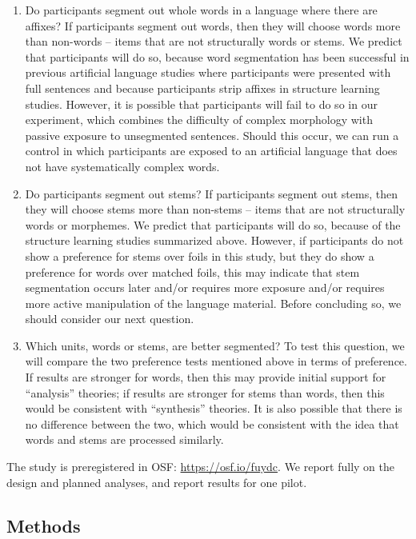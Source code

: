 \documentclass[
  american,
  ,man,floatsintext]{apa6}
\providecommand{\tightlist}{%
  \setlength{\itemsep}{0pt}\setlength{\parskip}{0pt}}
\begin{document}
\begin{enumerate}
\def\labelenumi{\arabic{enumi}.}
\tightlist
\item
  Do participants segment out whole words in a language where there are affixes? If participants segment out words, then they will choose words more than non-words -- items that are not structurally words or stems. We predict that participants will do so, because word segmentation has been successful in previous artificial language studies where participants were presented with full sentences and because participants strip affixes in structure learning studies. However, it is possible that participants will fail to do so in our experiment, which combines the difficulty of complex morphology with passive exposure to unsegmented sentences. Should this occur, we can run a control in which participants are exposed to an artificial language that does not have systematically complex words.
\item
  Do participants segment out stems? If participants segment out stems, then they will choose stems more than non-stems -- items that are not structurally words or morphemes. We predict that participants will do so, because of the structure learning studies summarized above. However, if participants do not show a preference for stems over foils in this study, but they do show a preference for words over matched foils, this may indicate that stem segmentation occurs later and/or requires more exposure and/or requires more active manipulation of the language material. Before concluding so, we should consider our next question.
\item
  Which units, words or stems, are better segmented? To test this question, we will compare the two preference tests mentioned above in terms of preference. If results are stronger for words, then this may provide initial support for ``analysis'' theories; if results are stronger for stems than words, then this would be consistent with ``synthesis'' theories. It is also possible that there is no difference between the two, which would be consistent with the idea that words and stems are processed similarly.
\end{enumerate}

The study is preregistered in OSF: \url{https://osf.io/fuydc}. We report fully on the design and planned analyses, and report results for one pilot.

\hypertarget{methods}{%
\subsection{Methods}\label{methods}}
\end{document}
